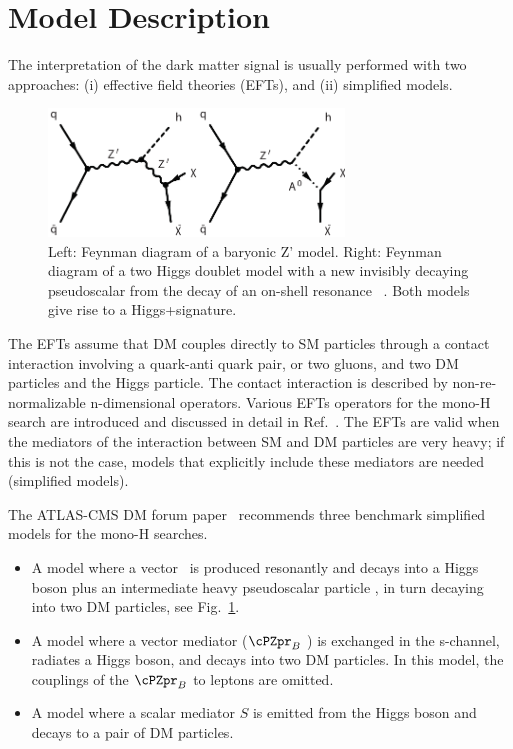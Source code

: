 \section{Model Description \label{sec:model}}



The interpretation of the dark matter signal is usually performed with
two approaches: (i) effective field theories (EFTs), and (ii) simplified models. 

\begin{figure}[htbp]
   \centering
   \includegraphics[width=0.7\textwidth]{figures/feyns/feyns.pdf}
   \caption{Left: Feynman diagram of a baryonic Z' model. Right: Feynman diagram of a two Higgs doublet model with a new
     invisibly decaying pseudoscalar \Az from the decay of an on-shell
     resonance \cPZpr\  . Both models give rise to a Higgs+\MET signature. }
   \label{fig:feynman}
\end{figure}

The EFTs assume that DM couples directly to SM particles through a
contact interaction involving a quark-anti quark pair, or two gluons,
and two DM particles and the Higgs particle. The contact interaction 
is described by non-re-normalizable n-dimensional operators. 
Various EFTs operators for the mono-H search are introduced 
and discussed in detail in Ref.~\cite{Irvine}.
The EFTs are valid when the mediators of the interaction between SM and DM 
particles are very heavy; if this is not the case, models that explicitly include 
these mediators are needed (simplified models). 

The ATLAS-CMS DM forum paper~\cite{Abercrombie:2015wmb} recommends three 
benchmark simplified models for the mono-H searches. 
\begin{itemize}
\item  A model where a vector \cPZpr\ is produced resonantly and
  decays into a Higgs boson plus an intermediate heavy pseudoscalar
  particle \Az, in turn decaying into two DM particles, see Fig.~\ref{fig:feynman}.

\item A model where a vector mediator ($\cPZpr_{B}$ ) is exchanged in
  the s-channel, radiates a Higgs boson, and decays into two DM
  particles. In this model, the couplings of the $\cPZpr_{B}$ to
  leptons are omitted.
%
\item A model where a scalar mediator $S$ is emitted from the Higgs
  boson and decays to a pair of DM particles.
%
\end{itemize}

